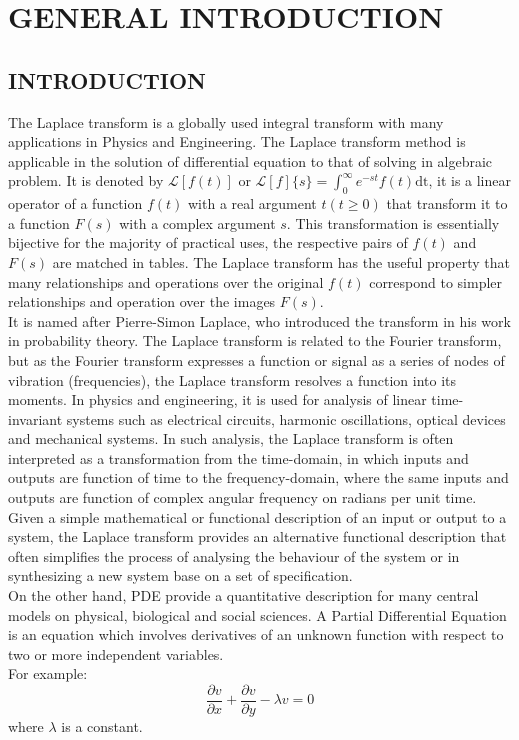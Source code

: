 \documentclass[11pt]{report}
\newcommand{\Laplace}{\mathcal{L}}
\newcommand{\ft}{f(t)}
\newcommand{\Fs}{F(s)}
\newcommand{\LaplaceIntegral}{\int_{0}^{\infty}e^{-st}\ft\text{dt}}
\newcommand{\sbracket}[1]{\left[#1\right]}
\newcommand{\LFt}{\Laplace \sbracket{\ft}}
\newcommand{\LFn}[1]{\Laplace \sbracket{#1}}
\newcommand{\sps}{\\[0.2cm]}
\newcommand{\dsp}{\displaystyle}
\newcommand{\PDe}{Partial Differential Equation }
\begin{document}
	\newpage
	\chapter{GENERAL INTRODUCTION}
	
	\section{INTRODUCTION}
	The Laplace transform is a globally used integral transform with many applications in Physics and Engineering. The Laplace transform method is applicable in the solution of differential equation to that of solving in algebraic problem. It is denoted by $\LFt$ or $\dsp\LFn{f}\{s\} = \LaplaceIntegral$, it is a linear operator of a function $\ft$ with a real argument $t(t\geq 0)$ that transform it to a function $\Fs$ with a complex argument $s$. This transformation is essentially bijective for the majority of practical uses, the respective pairs of $\ft$ and $\Fs$ are matched in tables. The Laplace transform has the useful property that many relationships and operations over the original $\ft$ correspond to simpler relationships and operation over the images $\Fs$.\\
	
	It is named after Pierre-Simon Laplace, who introduced the transform in his work in probability theory. The Laplace transform is related to the Fourier transform, but as the Fourier transform expresses a function or signal as a series of nodes of vibration (frequencies), the Laplace transform resolves a function into its moments. In physics and engineering, it is used for analysis of linear time-invariant systems such as electrical circuits, harmonic oscillations, optical devices and mechanical systems. In such analysis, the Laplace transform is often interpreted as a transformation from the time-domain, in which inputs and outputs are function of time to the frequency-domain, where the same inputs and outputs are function of complex angular frequency on radians per unit time. Given a simple mathematical or functional description of an input or output to a system, the Laplace transform provides an alternative functional description that often simplifies the process of analysing the behaviour of the system or in synthesizing a new system base on a set of specification.\\
	
	On the other hand, PDE provide a quantitative description for many central models on physical, biological and social sciences. A \PDe is an equation which involves derivatives of an unknown function with respect to two or more independent variables.\sps
	For example:
	\begin{equation}
		\frac{\partial v}{\partial x} + \frac{\partial v}{\partial y} - \lambda v = 0
		\label{eq:1_1}
	\end{equation}
	where $\lambda$ is a constant.\sps
	
\end{document}
